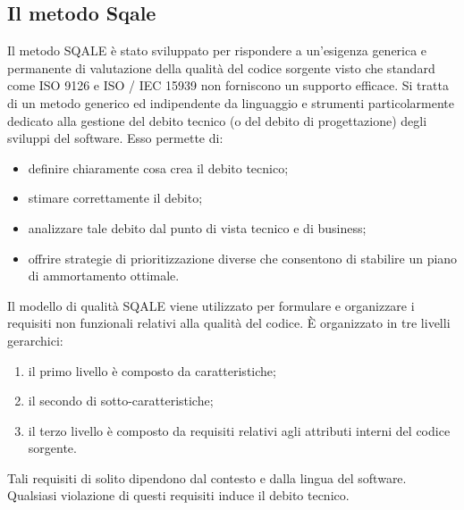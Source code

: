 \subsection{Il metodo Sqale}
Il metodo SQALE è stato sviluppato per rispondere a un'esigenza generica e permanente di valutazione della qualità del codice sorgente visto che standard come ISO 9126 e ISO / IEC 15939 non forniscono un supporto efficace. Si tratta di un metodo generico ed indipendente da linguaggio e strumenti particolarmente dedicato alla gestione del debito tecnico (o del debito di progettazione) degli sviluppi del software. Esso permette di:
\begin{itemize}
\item definire chiaramente cosa crea il debito tecnico;
\item stimare correttamente il debito;
\item analizzare tale debito dal punto di vista tecnico e di business;
\item offrire strategie di prioritizzazione diverse che consentono di stabilire un piano di ammortamento ottimale. 
\end{itemize}
Il modello di qualità SQALE viene utilizzato per formulare e organizzare i requisiti non funzionali relativi alla qualità del codice. È organizzato in tre livelli gerarchici:
\begin{enumerate}
\item il primo livello è composto da caratteristiche;
\item il secondo di sotto-caratteristiche;
\item il terzo livello è composto da requisiti relativi agli attributi interni del codice sorgente.
\end{enumerate}
Tali requisiti di solito dipendono dal contesto e dalla lingua del software. Qualsiasi violazione di questi requisiti induce il debito tecnico.